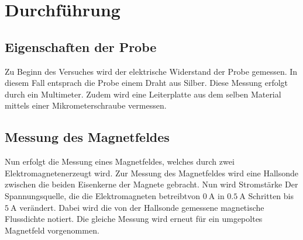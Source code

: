 \section{Durchführung}
\label{sec:Durchführung}
\subsection{Eigenschaften der Probe}
Zu Beginn des Versuches wird der elektrische Widerstand der Probe gemessen. In diesem Fall entsprach die Probe 
einem Draht aus Silber. Diese Messung erfolgt durch ein Multimeter.
Zudem wird eine Leiterplatte aus dem selben Material mittels einer Mikrometerschraube vermessen.
\subsection{Messung des Magnetfeldes}
Nun erfolgt die Messung eines Magnetfeldes, welches durch zwei Elektromagnetenerzeugt wird. Zur Messung des 
Magnetfeldes wird eine Hallsonde zwischen die beiden Eisenkerne der Magnete gebracht. Nun wird Stromstärke Der
Spannungsquelle, die die Elektromagneten betreibtvon $\SI{0}{\ampere}$ in $\SI{0.5}{\ampere}$
Schritten bis $\SI{5}{\ampere}$ verändert. Dabei wird die von der Hallsonde gemessene magnetische Flussdichte
notiert. Die gleiche Messung wird erneut für ein umgepoltes Magnetfeld vorgenommen.

